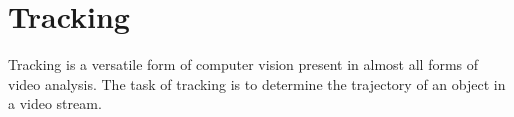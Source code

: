 \section{Tracking}
  Tracking is a versatile form of computer vision present in almost all forms of video analysis.
  The task of tracking is to determine the trajectory of an object in a video stream.
  
  
  
  
  
